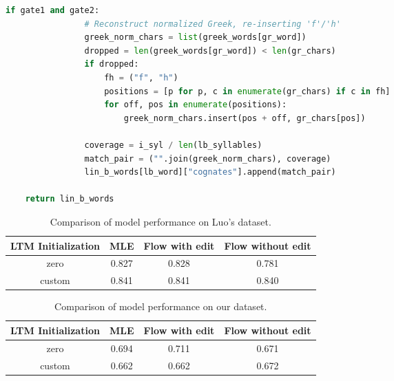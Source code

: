 \begin{lstlisting}[language=Python, caption=Brute-Force matching algorithm, breaklines=true, postbreak=\mbox{\hspace{50pt}\textcolor{red}{$\hookrightarrow$}\space}]
            if gate1 and gate2:
                # Reconstruct normalized Greek, re-inserting 'f'/'h'
                greek_norm_chars = list(greek_words[gr_word])
                dropped = len(greek_words[gr_word]) < len(gr_chars)
                if dropped:
                    fh = ("f", "h")
                    positions = [p for p, c in enumerate(gr_chars) if c in fh]
                    for off, pos in enumerate(positions):
                        greek_norm_chars.insert(pos + off, gr_chars[pos])

                coverage = i_syl / len(lb_syllables)
                match_pair = ("".join(greek_norm_chars), coverage)
                lin_b_words[lb_word]["cognates"].append(match_pair)

    return lin_b_words
\end{lstlisting}

\newpage


\begin{table}[h!]
\centering
\begin{tabular}{|c|c|c|c|}
\hline
\textbf{LTM Initialization} & \textbf{MLE} & \textbf{Flow with edit} & \textbf{Flow without edit} \\
\hline
zero & 0.827 & 0.828 & 0.781 \\
custom & 0.841 & 0.841 & 0.840 \\
\hline
\end{tabular}
\caption{Comparison of model performance on Luo's dataset.}
\end{table}

\begin{table}[h!]
\centering
\begin{tabular}{|c|c|c|c|}
\hline
\textbf{LTM Initialization} & \textbf{MLE} & \textbf{Flow with edit} & \textbf{Flow without edit} \\
\hline
zero & 0.694 & 0.711 & 0.671 \\
custom & 0.662 & 0.662 & 0.672 \\
\hline
\end{tabular}
\caption{Comparison of model performance on our dataset.}
\end{table}

